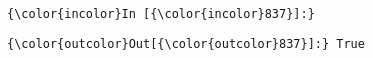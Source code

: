 \documentclass[11pt]{article}
\begin{document}
    \begin{center}
    \end{center}
    { \hspace*{\fill} \\}
    
    \begin{Verbatim}[commandchars=\\\{\}]
{\color{incolor}In [{\color{incolor}837}]:} 
\end{Verbatim}


\begin{Verbatim}[commandchars=\\\{\}]
{\color{outcolor}Out[{\color{outcolor}837}]:} True
\end{Verbatim}
            

    
    
    
    
\end{document}
